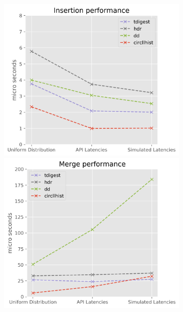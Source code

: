 \documentclass{article}
\theoremstyle{plain}
\theoremstyle{remark}
\begin{document}
\begin{figure}
    \begin{subfigure}{\textwidth}
      \includegraphics[width=\textwidth/3]{evaluation/images/all_perf_insert.png}
      \includegraphics[width=\textwidth/3]{evaluation/images/all_perf_merge.png}

\end{subfigure}
\end{figure}
\end{document}
